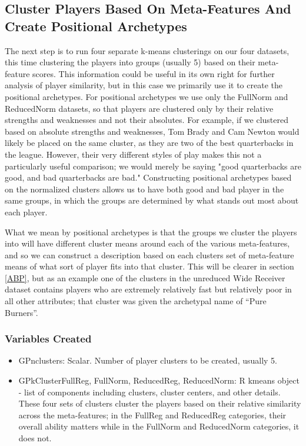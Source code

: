 \documentclass[11pt]{article}
\begin{document}
\subsection{Cluster Players Based On Meta-Features And Create Positional Archetypes}

The next step is to run four separate k-means clusterings on our four datasets, this time clustering the players into groups (usually 5) based on their meta-feature scores. This information could be useful in its own right for further analysis of player similarity, but in this case we primarily use it to create the positional archetypes. For positional archetypes we use only the FullNorm and ReducedNorm datasets, so that players are clustered only by their relative strengths and weaknesses and not their absolutes. For example, if we clustered based on absolute strengths and weaknesses, Tom Brady and Cam Newton would likely be placed on the same cluster, as they are two of the best quarterbacks in the league. However, their very different styles of play makes this not a particularly useful comparison; we would merely be saying "good quarterbacks are good, and bad quarterbacks are bad." Constructing positional archetypes based on the normalized clusters allows us to have both good and bad player in the same groups, in which the groups are determined by what stands out most about each player.

What we mean by positional archetypes is that the groups we cluster the players into will have different cluster means around each of the various meta-features, and so we can construct a description based on each clusters set of meta-feature means of what sort of player fits into that cluster. This will be clearer in section \ref{ABP}, but as an example one of the clusters in the unreduced Wide Receiver dataset contains players who are extremely relatively fast but relatively poor in all other attributes; that cluster was given the archetypal name of ``Pure Burners''.

\subsubsection{Variables Created}

\begin{itemize}
\item{GPnclusters}: Scalar. Number of player clusters to be created, usually 5.
\item{GPkClusterFullReg, FullNorm, ReducedReg, ReducedNorm}: R kmeans object - list of components including clusters, cluster centers, and other details. These four sets of clusters cluster the players based on their relative similarity across the meta-features; in the FullReg and ReducedReg categories, their overall ability matters while in the FullNorm and ReducedNorm categories, it does not. 
\end{itemize}
\end{document}
